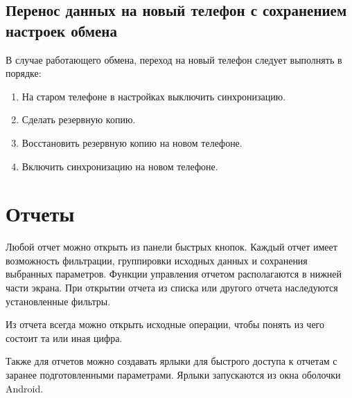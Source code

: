 \documentclass[a4paper,10pt,russian]{sphinxmanual}
\begin{document}
\section{Перенос данных на новый телефон с сохранением настроек обмена}
\label{\detokenize{teamwork:id11}}
\sphinxAtStartPar
В случае работающего обмена, переход на новый телефон следует выполнять в порядке:
\begin{enumerate}
%
\item {} 
\sphinxAtStartPar
На старом телефоне в настройках выключить синхронизацию.

\item {} 
\sphinxAtStartPar
Сделать резервную копию.

\item {} 
\sphinxAtStartPar
Восстановить резервную копию на новом телефоне.

\item {} 
\sphinxAtStartPar
Включить синхронизацию на новом телефоне.

\end{enumerate}

\sphinxstepscope


\chapter{Отчеты}
\label{\detokenize{reports:chapter-reports}}\label{\detokenize{reports:id1}}\label{\detokenize{reports::doc}}
\sphinxAtStartPar
Любой отчет можно открыть из панели быстрых кнопок. Каждый отчет имеет возможность фильтрации,
группировки исходных данных и сохранения выбранных параметров. Функции
управления отчетом располагаются в нижней части экрана. При открытии отчета из списка или
другого отчета наследуются установленные фильтры.

\noindent{}
\noindent{}
\noindent{}
\noindent{}
\noindent{}

\sphinxAtStartPar
Из отчета всегда можно открыть исходные операции, чтобы понять из чего состоит та или иная цифра.

\sphinxAtStartPar
Также для отчетов можно создавать ярлыки для быстрого доступа к отчетам с заранее подготовленными параметрами.
Ярлыки запускаются из окна оболочки Android.
\end{document}
